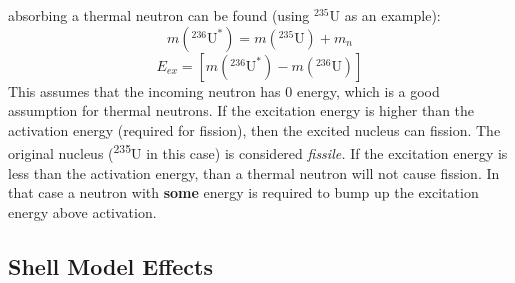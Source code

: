 \documentclass[letter]{article}
\begin{document}
\begin{itemize}
  absorbing a thermal neutron can be found
  (using $^{235}$U as an example):
  \begin{equation*}
    m(^{236}\text{U}^*)=m(^{235}\text{U})+m_n
  \end{equation*}
  \begin{equation*}
    E_{ex} = [m(^{236}\text{U}^*)-m(^{236}\text{U})]
  \end{equation*}
This assumes that the incoming neutron has 0 energy, which is a good
assumption for thermal neutrons. If the excitation energy is higher than the activation energy
(required for fission), then the excited nucleus can fission. The
original nucleus (\textsuperscript{235}U in this case) is considered
\textit{fissile.} If the excitation energy is less than the activation
energy, than a thermal neutron will not cause fission. In that case a neutron with
\textbf{some} energy is required to bump up the excitation energy
above activation.~\cite[pp. 488-489]{krane}
\end{itemize}
\subsection{Shell Model Effects}
\end{document}

